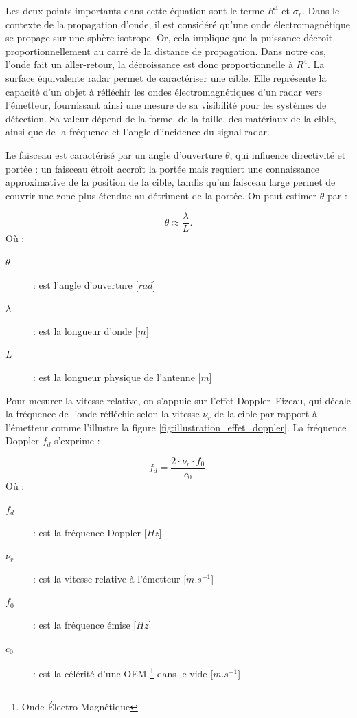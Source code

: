 Les deux points importants dans cette équation sont le terme $R^4$ et $\sigma_r$. Dans le contexte de la propagation d'onde, il est considéré qu'une onde électromagnétique se propage sur une sphère isotrope. Or, cela implique que la puissance décroît proportionnellement au carré de la distance de propagation. Dans notre cas, l'onde fait un aller-retour, la décroissance est donc proportionnelle à $R^4$. La surface équivalente radar permet de caractériser une cible. Elle représente la capacité d’un objet à réfléchir les ondes électromagnétiques d’un radar vers l’émetteur, fournissant ainsi une mesure de sa visibilité pour les systèmes de détection. Sa valeur dépend de la forme, de la taille, des matériaux de la cible, ainsi que de la fréquence et l’angle d’incidence du signal radar.

Le faisceau est caractérisé par un angle d’ouverture $\theta$, qui influence directivité et portée : un faisceau étroit accroît la portée mais requiert une connaissance approximative de la position de la cible, tandis qu’un faisceau large permet de couvrir une zone plus étendue au détriment de la portée. On peut estimer $\theta$ par \cite{skolnik2001,richards2010} :

\begin{equation}
    \theta \approx \frac{\lambda}{L}.
    \label{eq:approx_angle_ouverture_antenne}
\end{equation}
Où :
\begin{description}
    \item[$\theta$] : est l'angle d'ouverture [$rad$]
    \item[$\lambda$] : est la longueur d’onde [$m$]
    \item[$L$] : est la longueur physique de l'antenne [$m$]
\end{description}
\vspace{1em}

Pour mesurer la vitesse relative, on s’appuie sur l’effet Doppler–Fizeau, qui décale la fréquence de l’onde réfléchie selon la vitesse $\nu_r$ de la cible par rapport à l’émetteur comme l'illustre la figure \ref{fig:illustration_effet_doppler}. La fréquence Doppler $f_d$ s’exprime \cite{skolnik2001} :

\begin{equation}
    f_d = \frac{2\cdot\nu_r \cdot f_0}{c_0}.
    \label{eq:frequence_doppler}
\end{equation}
Où :
\begin{description}
    \item[$f_d$] : est la fréquence Doppler [$Hz$]
    \item[$\nu_r$] : est la vitesse relative à l'émetteur [$m.s^{-1}$]
    \item[$f_0$] : est la fréquence émise [$Hz$] 
    \item[$c_0$] : est la célérité d'une OEM \footnote{Onde Électro-Magnétique} dans le vide [$m.s^{-1}$] 
\end{description}


